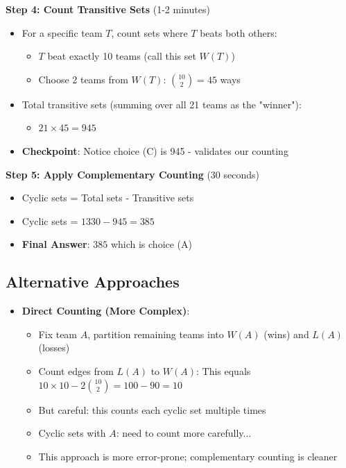 \documentclass[]{article}
\begin{document}
\begin{solutionbox}
\textbf{Step 4: Count Transitive Sets} (1-2 minutes)
\begin{itemize}[leftmargin=*]
    \item For a specific team $T$, count sets where $T$ beats both others:
    \begin{itemize}
        \item $T$ beat exactly 10 teams (call this set $W(T)$)
        \item Choose 2 teams from $W(T)$: $\binom{10}{2} = 45$ ways
    \end{itemize}
    \item Total transitive sets (summing over all 21 teams as the "winner"):
    \begin{itemize}
        \item $21 \times 45 = 945$
    \end{itemize}
    \item \textbf{Checkpoint}: Notice choice (C) is 945 - validates our counting
\end{itemize}

\textbf{Step 5: Apply Complementary Counting} (30 seconds)
\begin{itemize}[leftmargin=*]
    \item Cyclic sets = Total sets - Transitive sets
    \item Cyclic sets = $1330 - 945 = 385$
    \item \textbf{Final Answer}: $\boxed{385}$ which is choice (A)
\end{itemize}

\subsection*{Alternative Approaches}
\begin{itemize}[leftmargin=*]
    \item \textbf{Direct Counting (More Complex)}:
    \begin{itemize}
        \item Fix team $A$, partition remaining teams into $W(A)$ (wins) and $L(A)$ (losses)
        \item Count edges from $L(A)$ to $W(A)$: This equals $10 \times 10 - 2\binom{10}{2} = 100 - 90 = 10$
        \item But careful: this counts each cyclic set multiple times
        \item Cyclic sets with $A$: need to count more carefully...
        \item This approach is more error-prone; complementary counting is cleaner
    \end{itemize}
\end{itemize}


\end{solutionbox}
\end{document}
